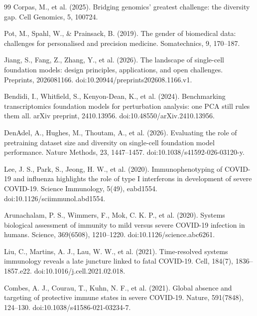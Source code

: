 \documentclass[11pt,a4paper]{article}
\begin{document}
\begin{thebibliography}{99}
Corpas, M., et al. (2025).
\newblock Bridging genomics' greatest challenge: the diversity gap.
\newblock Cell Genomics, 5, 100724.

Pot, M., Spahl, W., \& Prainsack, B. (2019).
\newblock The gender of biomedical data: challenges for personalised and precision medicine.
\newblock Somatechnics, 9, 170--187.

Jiang, S., Fang, Z., Zhang, Y., et al. (2026).
\newblock The landscape of single-cell foundation models: design principles, applications, and open challenges.
\newblock Preprints, 2026081166. doi:10.20944/preprints202608.1166.v1.

Bendidi, I., Whitfield, S., Kenyon-Dean, K., et al. (2024).
\newblock Benchmarking transcriptomics foundation models for perturbation analysis: one PCA still rules them all.
\newblock arXiv preprint, 2410.13956. doi:10.48550/arXiv.2410.13956.

DenAdel, A., Hughes, M., Thoutam, A., et al. (2026).
\newblock Evaluating the role of pretraining dataset size and diversity on single-cell foundation model performance.
\newblock Nature Methods, 23, 1447--1457. doi:10.1038/s41592-026-03120-y.

Lee, J. S., Park, S., Jeong, H. W., et al. (2020).
\newblock Immunophenotyping of COVID-19 and influenza highlights the role of type I interferons in development of severe COVID-19.
\newblock Science Immunology, 5(49), eabd1554. doi:10.1126/sciimmunol.abd1554.

Arunachalam, P. S., Wimmers, F., Mok, C. K. P., et al. (2020).
\newblock Systems biological assessment of immunity to mild versus severe COVID-19 infection in humans.
\newblock Science, 369(6508), 1210--1220. doi:10.1126/science.abc6261.

Liu, C., Martins, A. J., Lau, W. W., et al. (2021).
\newblock Time-resolved systems immunology reveals a late juncture linked to fatal COVID-19.
\newblock Cell, 184(7), 1836--1857.e22. doi:10.1016/j.cell.2021.02.018.

Combes, A. J., Courau, T., Kuhn, N. F., et al. (2021).
\newblock Global absence and targeting of protective immune states in severe COVID-19.
\newblock Nature, 591(7848), 124--130. doi:10.1038/s41586-021-03234-7.


\end{thebibliography}
\end{document}
